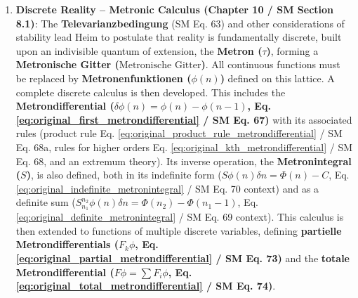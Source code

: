\documentclass[12pt]{article}
\newcommand{\metron}{\tau}
\newcommand{\metronischegitter}{\text{Metronische Gitter}}
\newcommand{\metrondifferential}{\delta}
\newcommand{\metronintegral}{S}
\newcommand{\metronenfunktion}{\phi(n)}
\newcommand{\metronenziffer}{n}
\begin{document}
\begin{enumerate}
    \item \textbf{Discrete Reality – Metronic Calculus (Chapter 10 / SM Section 8.1)}: The \textbf{Televarianzbedingung} (SM Eq. 63) and other considerations of stability lead Heim to postulate that reality is fundamentally discrete, built upon an indivisible quantum of extension, the \textbf{Metron (\( \metron \))}, forming a \textbf{Metronische Gitter (\(\metronischegitter\))}. All continuous functions must be replaced by \textbf{Metronenfunktionen (\( \metronenfunktion \))} defined on this lattice. A complete discrete calculus is then developed. This includes the \textbf{Metrondifferential (\( \metrondifferential\phi(\metronenziffer) = \phi(\metronenziffer) - \phi(\metronenziffer-1) \), Eq. \eqref{eq:original_first_metrondifferential} / SM Eq. 67)} with its associated rules (product rule Eq. \eqref{eq:original_product_rule_metrondifferential} / SM Eq. 68a, rules for higher orders Eq. \eqref{eq:original_kth_metrondifferential} / SM Eq. 68, and an extremum theory). Its inverse operation, the \textbf{Metronintegral (\( \metronintegral \))}, is also defined, both in its indefinite form (\( \metronintegral\phi(\metronenziffer)\metrondifferential\metronenziffer = \Phi(\metronenziffer)-C \), Eq. \eqref{eq:original_indefinite_metronintegral} / SM Eq. 70 context) and as a definite sum (\( \metronintegral_{n_1}^{n_2}\phi(\metronenziffer)\metrondifferential\metronenziffer = \Phi(n_2)-\Phi(n_1-1) \), Eq. \eqref{eq:original_definite_metronintegral} / SM Eq. 69 context). This calculus is then extended to functions of multiple discrete variables, defining \textbf{partielle Metrondifferentials (\( F_k\phi \), Eq. \eqref{eq:original_partial_metrondifferential} / SM Eq. 73)} and the \textbf{totale Metrondifferential (\( F\phi = \sum F_i\phi \), Eq. \eqref{eq:original_total_metrondifferential} / SM Eq. 74)}.


\end{enumerate}
\end{document}
